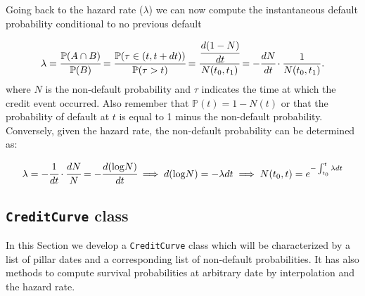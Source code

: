 Going back to the hazard rate ($\lambda$) we can now compute the instantaneous default probability conditional to no previous default 

\[\lambda = \cfrac{\mathbb{P}(A\cap B)}{\mathbb{P}(B)} = \cfrac{\mathbb{P}(\tau\in (t, t+dt))}{\mathbb{P}(\tau>t)} = \cfrac{\cfrac{d(1-N)}{dt}}{N(t_0, t_1)} = -\cfrac{dN}{dt}\cdot\frac{1}{N(t_0, t_1)}.\]
where $N$ is the non-default probability and $\tau$ indicates the time at which the credit event occurred. Also remember that $\mathbb{P}(t) = 1 - N(t)$ or that the probability of default at $t$ is equal to 1 minus the non-default probability.
Conversely, given the hazard rate, the non-default probability can be
determined as:

\[\lambda = -\cfrac{1}{dt}\cdot\cfrac{dN}{N} = -\cfrac{d(\textrm{log}N)}{dt} \implies d(\textrm{log}N) = -\lambda dt \implies N(t_0, t) = e^{-\int_{t_0}^{t}\lambda dt}\]

\subsection{\texttt{CreditCurve} class}

In this Section we develop a \texttt{CreditCurve} class which will be characterized by a list of pillar dates and a corresponding list of non-default probabilities. It has also methods to compute survival probabilities at arbitrary date by interpolation and the hazard rate.
  
